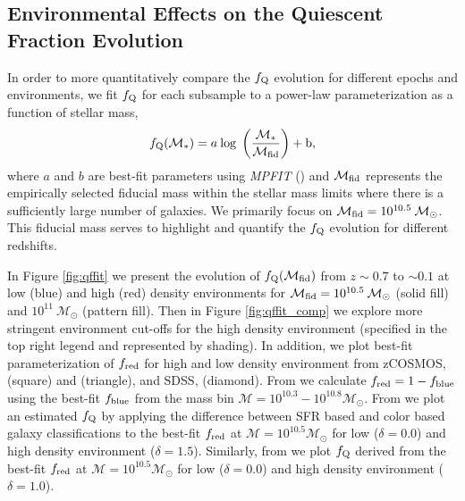 \documentclass{emulateapj}
\begin{document}
\subsection{Environmental Effects on the Quiescent Fraction Evolution} \label{sec:env_qf_evol}
In order to more quantitatively compare the $f_{\rm{Q}}$ evolution for different epochs and environments, we fit $f_{\rm{Q}}$ for each subsample to a power-law parameterization as a function of stellar mass, 
\begin{equation} \label{eq:qffit}
f_{\rm{Q}}(\mathcal{M}_{*}) = a \: \rm{log} \; \left(\frac{ \mathcal{M}_{*}}{\mathcal{M}_{\rm{fid}}} \right)+b,
\end{equation}
where $a$ and $b$ are best-fit parameters using {\em MPFIT} (\citealt{Markwardt:2009aa}) and $\mathcal{M}_{\rm{fid}}$ represents the empirically selected fiducial mass within the stellar mass limits where there is a sufficiently large number of galaxies. We primarily focus on $\mathcal{M}_{\rm{fid}} = 10^{10.5} \: \mathcal{M}_{\odot}$. This fiducial mass serves to highlight and quantify the $f_{\rm{Q}}$ evolution for different redshifts. 

In Figure \ref{fig:qffit} we present the evolution of $f_{\rm{Q}}(\mathcal{M}_{\rm{fid}})$ from $z \sim 0.7$ to $\sim 0.1$ at low (blue) and high (red) density environments for $\mathcal{M}_{\rm{fid}} = 10^{10.5} \: \mathcal{M}_{\odot}$ (solid fill) and $10^{11} \: \mathcal{M}_{\odot}$ (pattern fill). Then in Figure \ref{fig:qffit_comp} we explore more stringent environment cut-offs for the high density environment (specified in the top right legend and represented by shading). In addition, we plot best-fit parameterization of $f_{\rm{red}}$ for high and low density environment from zCOSMOS, \cite{Iovino:2010aa} (square) and \cite{Kovac:2014aa} (triangle), and SDSS, \cite{Baldry:2006aa} (diamond). From \cite{Iovino:2010aa} we calculate $f_{\rm{red}} = 1-f_{\rm{blue}}$ using the best-fit $f_{\rm{blue}}$ from the mass bin $\mathcal{M} = 10^{10.3} - 10^{10.8} \mathcal{M}_{\odot}$. From \cite{Kovac:2014aa} we plot an estimated $f_{\rm{Q}}$ by applying the difference between SFR based and color based galaxy classifications to the best-fit $f_{\rm{red}}$ at $\mathcal{M} = 10^{10.5} \mathcal{M}_{\odot}$ for low ($\delta = 0.0$) and high density environment ($\delta = 1.5$). Similarly, from \cite{Baldry:2006aa} we plot $f_{\rm{Q}}$ derived from the best-fit $f_{\rm{red}}$ at $\mathcal{M} = 10^{10.5} \mathcal{M}_{\odot}$ for low ($\delta = 0.0$) and high density environment ($\delta = 1.0$).
\end{document}
